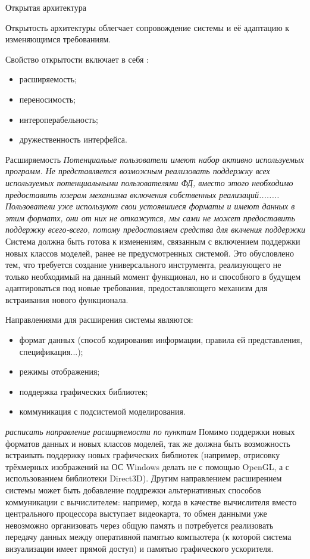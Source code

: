 \documentclass[a4paper,12pt]{extarticle}
\begin{document}
\begin{subsection}{Открытая архитектура}
    \label{sec:requirements-open}
    
    Открытость архитектуры облегчает сопровождение системы и её адаптацию к изменяющимся требованиям.

    Свойство открытости включает в себя \cite{filinov-os}:
    \begin{itemize}
        \item расширяемость;
        \item переносимость;
        \item интероперабельность;
        \item дружественность интерфейса.
    \end{itemize}

    \begin{subsubsection}{Расширяемость}
        \textit{Потенциальые пользователи имеют набор активно используемых программ. Не представляется возможным реализовать поддержку всех используемых потенциальными пользователями ФД, вместо этого необходимо предоставить юзерам механизма включения собственных реализаций........ Пользователи уже используют свои устоявшиеся форматы и имеют данных в этим форматх, они от них не откажутся, мы сами не может предоставить поддержку всего-всего, потому предоставляем средства для вклчения поддержки} Система должна быть готова к изменениям, связанным с включением поддержки новых классов моделей, ранее не предусмотренных системой. Это обусловлено тем, что требуется создание универсального инструмента, реализующего не только необходимый на данный момент функционал, но и способного в будущем адаптироваться под новые требования, предоставляющего механизм для встраивания нового функционала.
        
        Направлениями для расширения системы являются:
        \begin{itemize}
            \item формат данных (способ кодирования информации, правила ей представления, спецификация...);
            \item режимы отображения;
            \item поддержка графических библиотек;
            \item коммуникация с подсистемой моделирования.
        \end{itemize}
        
        \textit{расписать направление расширяемости по пунктам} Помимо поддержки новых форматов данных и новых классов моделей, так же должна быть возможность встраивать поддержку новых графических библиотек (например, отрисовку трёхмерных изображений на ОС Windows делать не с помощью OpenGL, а с использованием библиотеки Direct3D). Другим направлением расширением системы может быть добавление поддрежки альтернативных способов коммуникации с вычислителем: например, когда в качестве вычислителя вместо центрального процессора выступает видеокарта, то обмен данными уже невозможно организовать через общую память и потребуется реализовать передачу данных между оперативной памятью компьютера (к которой система визуализации имеет прямой доступ) и памятью графического ускорителя.
        

\end{subsubsection}
\end{subsection}
\end{document}
